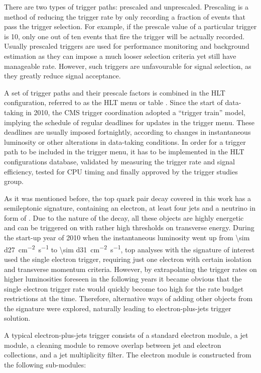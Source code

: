 There are two types of trigger paths: prescaled and unprescaled. Prescaling is a method of reducing the trigger rate by
only recording a fraction of events that pass the trigger selection. For example, if the prescale value of a particular
trigger is 10, only one out of ten events that fire the trigger will be actually recorded. Usually prescaled triggers
are used for performance monitoring and background estimation as they can impose a much looser selection criteria yet
still have manageable rate. However, such triggers are unfavourable for signal selection, as they greatly reduce signal
acceptance.

A set of trigger paths and their prescale factors is combined in the HLT configuration, referred to as the HLT menu or
table \cite{HLT_commissioning}. Since the start of data-taking in 2010, the CMS trigger coordination adopted a ``trigger
train'' model, implying the schedule of regular deadlines for updates in the trigger menu. These deadlines are usually
imposed fortnightly, according to changes in instantaneous luminosity or other alterations in data-taking conditions. In
order for a trigger path to be included in the trigger menu, it has to be implemented in the HLT configurations
database, validated by measuring the trigger rate and signal efficiency, tested for CPU timing and finally approved by
the trigger studies group.

As it was mentioned before, the top quark pair decay covered in this work has a semileptonic signature, containing an
electron, at least four jets and a neutrino in form of \MET. Due to the nature of the decay, all these objects are
highly energetic and can be triggered on with rather high thresholds on transverse energy. During the start-up year of
2010 when the instantaneous luminosity went up from \SI{\sim d27}{\cm^{-2} s^{-1}} to \SI{\sim d31}{\cm^{-2} s^{-1}},
top analyses with the signature of interest used the single electron trigger, requiring just one electron with certain
isolation and transverse momentum criteria. However, by extrapolating the trigger rates on higher luminosities foreseen
in the following years it became obvious that the single electron trigger rate would quickly become too high for the
rate budget restrictions at the time. Therefore, alternative ways of adding other objects from the \ttbar signature were
explored, naturally leading to electron-plus-jets trigger solution.

A typical electron-plus-jets trigger consists of a standard electron module, a jet module, a cleaning module to remove
overlap between jet and electron collections, and a jet multiplicity filter. The electron module is constructed from the
following sub-modules:

